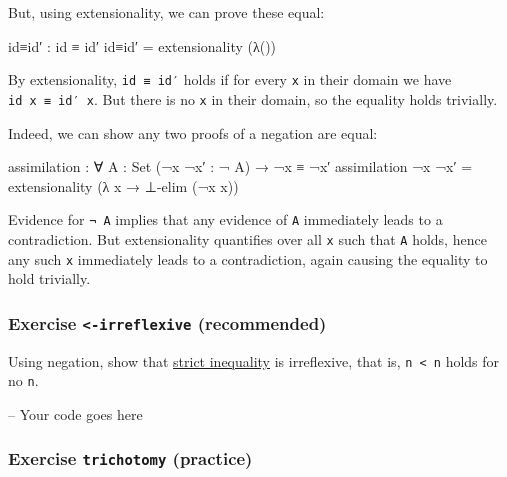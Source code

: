 But, using extensionality, we can prove these equal:

\begin{fence}
\begin{code}
id≡id′ : id ≡ id′
id≡id′ = extensionality (λ())
\end{code}
\end{fence}

By extensionality, \texttt{id\ ≡\ id′} holds if for every \texttt{x} in
their domain we have \texttt{id\ x\ ≡\ id′\ x}. But there is no
\texttt{x} in their domain, so the equality holds trivially.

Indeed, we can show any two proofs of a negation are equal:

\begin{fence}
\begin{code}
assimilation : ∀ {A : Set} (¬x ¬x′ : ¬ A) → ¬x ≡ ¬x′
assimilation ¬x ¬x′ = extensionality (λ x → ⊥-elim (¬x x))
\end{code}
\end{fence}

Evidence for \texttt{¬\ A} implies that any evidence of \texttt{A}
immediately leads to a contradiction. But extensionality quantifies over
all \texttt{x} such that \texttt{A} holds, hence any such \texttt{x}
immediately leads to a contradiction, again causing the equality to hold
trivially.

\hypertarget{exercise--irreflexive-recommended}{%
\subsubsection{\texorpdfstring{Exercise \texttt{\textless{}-irreflexive}
(recommended)}{Exercise \textless-irreflexive (recommended)}}\label{exercise--irreflexive-recommended}}

Using negation, show that
\protect\hyperlink{Relations-strict-inequality}{strict inequality} is
irreflexive, that is, \texttt{n\ \textless{}\ n} holds for no
\texttt{n}.

\begin{fence}
\begin{code}
-- Your code goes here
\end{code}
\end{fence}

\hypertarget{exercise-trichotomy-practice}{%
\subsubsection{\texorpdfstring{Exercise \texttt{trichotomy}
(practice)}{Exercise trichotomy (practice)}}\label{exercise-trichotomy-practice}}

